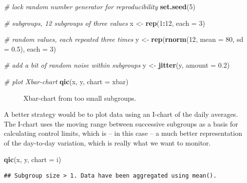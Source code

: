 \documentclass[
]{book}
\makeatletter
\newenvironment{Shaded}{\begin{snugshade}}{\end{snugshade}}
\newcommand{\AttributeTok}[1]{\textcolor[rgb]{0.13,0.29,0.53}{#1}}
\newcommand{\CommentTok}[1]{\textcolor[rgb]{0.56,0.35,0.01}{\textit{#1}}}
\newcommand{\DecValTok}[1]{\textcolor[rgb]{0.00,0.00,0.81}{#1}}
\newcommand{\FloatTok}[1]{\textcolor[rgb]{0.00,0.00,0.81}{#1}}
\newcommand{\FunctionTok}[1]{\textcolor[rgb]{0.13,0.29,0.53}{\textbf{#1}}}
\newcommand{\NormalTok}[1]{#1}
\newcommand{\OtherTok}[1]{\textcolor[rgb]{0.56,0.35,0.01}{#1}}
\newcommand{\SpecialCharTok}[1]{\textcolor[rgb]{0.81,0.36,0.00}{\textbf{#1}}}
\newcommand{\StringTok}[1]{\textcolor[rgb]{0.31,0.60,0.02}{#1}}
\newcommand*\pandocbounded[1]{%
  \sbox\pandoc@box{#1}%
  \Gscale@div\@tempa{\textheight}{\dimexpr\ht\pandoc@box+\dp\pandoc@box\relax}%
  \Gscale@div\@tempb{\linewidth}{\wd\pandoc@box}%
  \ifdim\@tempb\p@<\@tempa\p@\let\@tempa\@tempb\fi%
  \ifdim\@tempa\p@<\p@\scalebox{\@tempa}{\usebox\pandoc@box}%
  \else\usebox{\pandoc@box}%
  \fi%
}
\makeatother
\begin{document}
\begin{Shaded}
\begin{Highlighting}[]
\CommentTok{\# lock random number generator for reproducibility}
\FunctionTok{set.seed}\NormalTok{(}\DecValTok{5}\NormalTok{)}

\CommentTok{\# subgroups, 12 subgroups of three values}
\NormalTok{x }\OtherTok{\textless{}{-}} \FunctionTok{rep}\NormalTok{(}\DecValTok{1}\SpecialCharTok{:}\DecValTok{12}\NormalTok{, }\AttributeTok{each =} \DecValTok{3}\NormalTok{)}

\CommentTok{\# random values, each repeated three times}
\NormalTok{y }\OtherTok{\textless{}{-}} \FunctionTok{rep}\NormalTok{(}\FunctionTok{rnorm}\NormalTok{(}\DecValTok{12}\NormalTok{, }\AttributeTok{mean =} \DecValTok{80}\NormalTok{, }\AttributeTok{sd =} \FloatTok{0.5}\NormalTok{), }\AttributeTok{each =} \DecValTok{3}\NormalTok{)}

\CommentTok{\# add a bit of random noise within subgroups}
\NormalTok{y }\OtherTok{\textless{}{-}} \FunctionTok{jitter}\NormalTok{(y, }\AttributeTok{amount =} \FloatTok{0.2}\NormalTok{)}

\CommentTok{\# plot Xbar{-}chart}
\FunctionTok{qic}\NormalTok{(x, y, }\AttributeTok{chart =} \StringTok{\textquotesingle{}xbar\textquotesingle{}}\NormalTok{)}
\end{Highlighting}
\end{Shaded}

\begin{figure}
\centering
\pandocbounded{}
\caption{\label{fig:subgroups-fig3}Xbar-chart from too small subgroups.}
\end{figure}

A better strategy would be to plot data using an I-chart of the daily averages. The I-chart uses the moving range between successive subgroups as a basis for calculating control limits, which is -- in this case -- a much better representation of the day-to-day variation, which is really what we want to monitor.

\begin{Shaded}
\begin{Highlighting}[]
\FunctionTok{qic}\NormalTok{(x, y, }\AttributeTok{chart =} \StringTok{\textquotesingle{}i\textquotesingle{}}\NormalTok{)}
\end{Highlighting}
\end{Shaded}

\begin{verbatim}
## Subgroup size > 1. Data have been aggregated using mean().
\end{verbatim}
\end{document}
